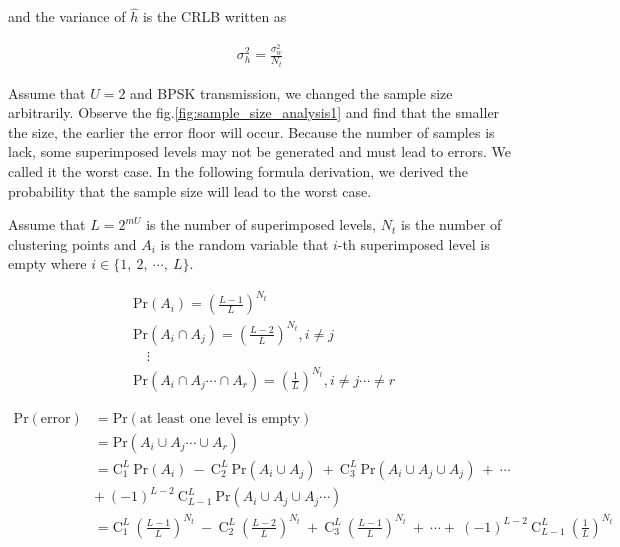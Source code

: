 and the variance of $\hat{h}$ is the CRLB written as

\begin{align}
\sigma^{2}_{h} = \frac{\sigma^{2}_{w}}{N_t}  
\end{align}

Assume that $U = 2$ and BPSK transmission, we changed the sample size arbitrarily. Observe the fig.\ref{fig:sample_size_analysis1} and find that the smaller the size, the earlier the error floor will occur. Because the number of samples is lack, some superimposed levels may not be generated and must lead to errors. We called it the worst case. In the following formula derivation, we derived the probability that the sample size will lead to the worst case.

Assume that $L=2^{mU}$ is the number of superimposed levels, $N_t$ is the number of clustering points and $A_i$ is the random variable that $i$-th superimposed level is empty where $i \in \{ 1, \ 2, \  \cdots, \  L \}$.

\begin{align}
& \text{Pr}{(A_i)} = {( \frac{L-1}{L} )}^{N_t} \nonumber \\
& \text{Pr}{(A_i \cap A_j)} = {( \frac{L-2}{L} )}^{N_t}, i \neq j  \ \nonumber \\
 & \quad \vdots \ \nonumber \\
& \text{Pr}{(A_i \cap A_j \cdots \cap A_r)} = {( \frac{1}{L} )}^{N_t}, i \neq j  \cdots \neq r \ 
\end{align}

\begin{align}
\text{Pr}{(\text{error})} &= \text{Pr}{(\text{at least one level is empty})} \ \nonumber \\
& = \text{Pr}{(A_i \cup A_j \cdots \cup A_r)} \ \nonumber \\
& = \text{C}^L_1 \ \text{Pr}{(A_i)} \ - \ \text{C}^L_2 \ \text{Pr}{(A_i \cup A_j)} \ + \ \text{C}^L_3 \ \text{Pr}{(A_i \cup A_j \cup A_j)} \ + \ \cdots  \nonumber \\
& + \ {(-1)}^{L-2} \ \text{C}^L_{L-1} \ \text{Pr}{(A_i \cup A_j \cup A_j \cdots)} \ \nonumber \\
& = \text{C}^L_1 \ {(\frac{L-1}{L})}^{N_t} \ - \ \text{C}^L_2 \ {(\frac{L-2}{L})}^{N_t} \ + \ \text{C}^L_3 \ {(\frac{L-1}{L})}^{N_t} \ + \ \cdots  + \ {(-1)}^{L-2} \ \text{C}^L_{L-1} \ {(\frac{1}{L})}^{N_t} \ 
\end{align}

